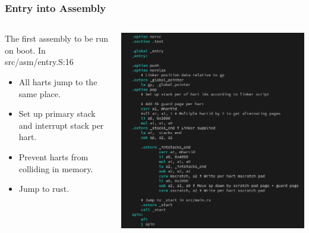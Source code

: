 \documentclass{beamer}
\begin{document}
\begin{frame}
  \frametitle{Entry into Assembly}
  \begin{columns}
    \begin{column}{0.5\textwidth}
      The first assembly to be run on boot.
      In src/asm/entry.S:16
      \begin{itemize}
      \item All harts jump to the same place.\\
      \item Set up primary stack and interrupt stack per hart.\\
      \item Prevent harts from colliding in memory.\\
      \item Jump to rust.
      \end{itemize}
    \end{column}
    \begin{column}{0.5\textwidth}
      \includegraphics[width=\textwidth]{entry.png}
    \end{column}
  \end{columns}
\end{frame}
\end{document}
